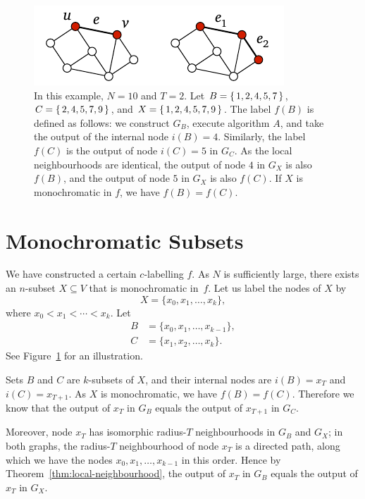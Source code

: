 \begin{figure}
    \centering
    \includegraphics[page=\PColourLB]{figs.pdf}
    \caption{In this example, $N = 10$ and $T = 2$. Let $B = \{\, 1,2,4,5,7 \,\}$, $C = \{\, 2,4,5,7,9 \,\}$, and $X = \{\, 1,2,4,5,7,9 \,\}$. The label $f(B)$ is defined as follows: we construct $G_B$, execute algorithm $A$, and take the output of the internal node $i(B) = 4$. Similarly, the label $f(C)$ is the output of node $i(C) = 5$ in $G_C$. As the local neighbourhoods are identical, the output of node $4$ in $G_X$ is also $f(B)$, and the output of node $5$ in $G_X$ is also $f(C)$. If $X$ is monochromatic in $f$, we have $f(B) = f(C)$.}\label{fig:colour-lb}
\end{figure}


\section{Monochromatic Subsets}

We have constructed a certain $c$-labelling $f$. As $N$ is sufficiently large, there exists an $n$-subset $X \subseteq V$ that is monochromatic in~$f$. Let us label the nodes of $X$ by
\[
    X = \{ x_0, x_1, \dotsc, x_k \},
\]
where $x_0 < x_1 < \dotsb < x_k$. Let
\begin{align*}
    B &= \{ x_0,x_1,\dotsc,x_{k-1} \}, \\
    C &= \{ x_1,x_2,\dotsc,x_k \}.
\end{align*}
See Figure~\ref{fig:colour-lb} for an illustration.

Sets $B$ and $C$ are $k$-subsets of $X$, and their internal nodes are $i(B) = x_{T}$ and $i(C) = x_{T+1}$. As $X$ is monochromatic, we have $f(B) = f(C)$. Therefore we know that the output of $x_{T}$ in $G_B$ equals the output of $x_{T+1}$ in $G_C$.

Moreover, node $x_{T}$ has isomorphic radius-$T$ neighbourhoods in $G_B$ and $G_X$; in both graphs, the radius-$T$ neighbourhood of node $x_{T}$ is a directed path, along which we have the nodes $x_0,x_1,\dotsc,\allowbreak x_{k-1}$ in this order. Hence by Theorem~\ref{thm:local-neighbourhood}, the output of $x_{T}$ in $G_B$ equals the output of $x_{T}$ in $G_X$.

